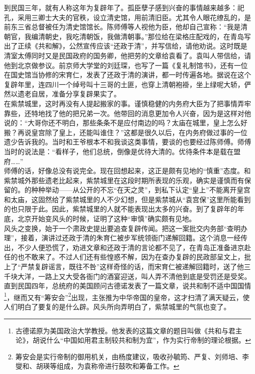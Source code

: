 到民国三年，就有人称这年为复辟年了。孤臣孽子感到兴奋的事情越来越多：祀孔，采用三卿士大夫的官秩，设立清史馆，用前清旧臣。尤其令人眼花缭乱的，是前东三省总督被任为清史馆馆长。陈师傅等人视他为臣，他却自己宣称：“我是清朝官，我编清朝史，我吃清朝饭，我做清朝事。”那位给在梁格庄配戏的，在青岛写出了正续《共和解》，公然宣传应该“还政于清”，并写信给，请他劝说。这时既是清室太傅同时又是民国政府的国务卿，他把劳的文章给袁看了。袁叫人带信给，请他到北京做参议。前京师大学堂的刘廷琛，也写了一篇《复礼制馆书》，还有一位在国史馆当协修的宋育仁，发表了还政于清的演讲，都一时传遍各地。据说在这个复辟年里，连四川一个绰号叫十三哥的土匪，也穿上清朝袍褂，坐上绿呢大轿，俨然以遗老自居，准备分享复辟果实了。\\

在紫禁城里，这时再没有人提起搬家的事。谨慎稳健的内务府大臣为了把事情弄牢靠些，还特地找了他的把兄弟一次。他带回的消息更加令人兴奋，因为是这样对他说的：“大哥你还不明白，那些条条不是应付南边的吗？太庙在城里，皇上怎么好搬？再说皇宫除了皇上，还能叫谁住？”这都是很久以后，在内务府做过事的一位遗少告诉我的。当时和王爷根本不和我谈这类事情，要谈的也要经过陈师傅。师傅当时的说法是：“看样子，他们总统，倒像是优待大清的。优待条件本是载在盟府……”\\

师傅的话，好像总没有说完全。现在回想起来，这正是颇有见地的“慎重”态度。和紫禁城外那些遗老比起来，紫禁城里在这段时期所表现的乐观，确实是谨慎而有保留的。的种种举动——从公开的不忘“在天之灵”，到私下认定“皇上”不能离开皇宫和太庙，这固然给了紫禁城里的人不少幻想，但是紫禁城从“袁宫保”这里所能看到的也只限于此。因此，紫禁城里的人就不能表现出太多的兴奋。到了复辟年的年底，北京开始变风头的时候，证明了这种“审慎”确实颇有见地。\\

风头之变换，始于一个肃政史提出要追查复辟传闻。把这一案批交内务部“查明办理”，接着，演讲过还政于清的朱育仁被步军统领衙门递解回籍。这个消息一经传出，不少人便恐慌了，劝进文章和还政于清的言论都不见了，在青岛正准备进京赴任的也不敢来了。不过人们还有些惶惑不解，因为在查办复辟的民政部呈文上，批上了“严禁复辟谣言，既往不咎”这样奇怪的话，而宋育仁被递解回籍时，送了他三千块大洋，一路上又大受各衙门的酒宴迎送，叫人弄不清他到底是受罚还是受奖。直到民国四年，总统府的美国顾问古德诺发表了一篇文章，说共和制不适中国国情\footnote{古德诺原为美国政治大学教授。他发表的这篇文章的题目叫做《共和与君主论》，胡说什么“中国如用君主制较共和制为宜”，作为实行帝制的理论根据。}，继而又有“筹安会”\footnote{筹安会是实行帝制的御用机关，由杨度建议，吸收孙毓筠、严复、刘师培、李燮和、胡瑛等组成，为袁称帝进行鼓吹和筹备工作。}出现，主张推为中华帝国的皇帝，这才扫清了满天疑云，使人们明白了要复的是什么辟。风头所向弄明白了，紫禁城里的气氛也变了。\\

